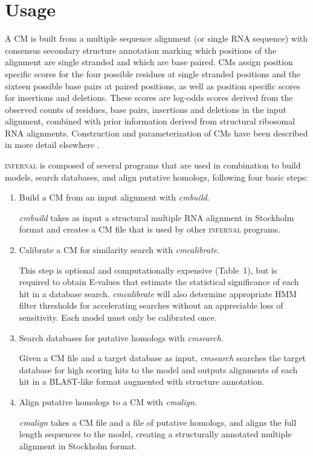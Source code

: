 
\section{Usage} 

A CM is built from a multiple sequence alignment (or single RNA
sequence) with consensus secondary structure annotation marking which
positions of the alignment are single stranded and which are base
paired. CMs assign position specific scores for the four possible
residues at single stranded positions and the sixteen possible base
pairs at paired positions, as well as position specific scores for
insertions and deletions. These scores are log-odds scores derived
from the observed counts of residues, base pairs, insertions and
deletions in the input alignment, combined with prior information
derived from structural ribosomal RNA alignments. Construction and
parameterization of CMs have been described in more detail elsewhere
\citep{Eddy94,infguide03,Eddy02b,NawrockiEddy07}.

\textsc{infernal} is composed of several programs that are used in
combination to build models, search databases, and align putative
homologs, following four basic steps:

\begin{enumerate}
\item Build a CM from an input alignment with \emph{cmbuild}.

\emph{cmbuild} takes as input a structural multiple
RNA alignment in Stockholm format \citep{infguide03} and creates a CM
file that is used by other \textsc{infernal} programs.

\item Calibrate a CM for similarity search with \emph{cmcalibrate}.

This step is optional and computationally expensive (Table~1), but is
required to obtain E-values that estimate the statistical significance
of each hit in a database search. \emph{cmcalibrate} will
also determine appropriate HMM filter thresholds for accelerating
searches without an appreciable loss of sensitivity. Each model must
only be calibrated once.

\item Search databases for putative homologs with \emph{cmsearch}.

Given a CM file and a target database as input, 
\emph{cmsearch} searches the target database
for high scoring hits to the model and outputs alignments
of each hit in a BLAST-like format augmented with structure
annotation.

\item Align putative homologs to a CM with \emph{cmalign}.

\emph{cmalign} takes a CM file and a file of putative homologs, and
aligns the full length sequences to the model, creating a structurally
annotated multiple alignment in Stockholm format.

\end{enumerate}

